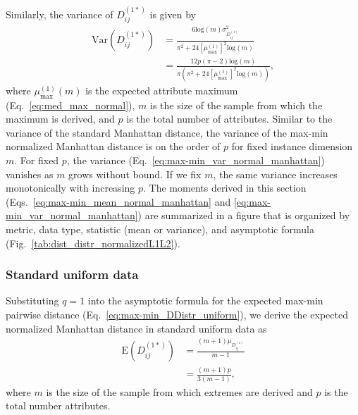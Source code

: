 \documentclass[10pt,letterpaper]{article}
\begin{document}
Similarly, the variance of $D^{(1*)}_{ij}$ is given by
%
\begin{equation}\label{eq:max-min_var_normal_manhattan}
\begin{aligned}
\text{Var}\left(D^{(1*)}_{ij}\right) &= \frac{6\text{log}(m)\sigma^2_{D^{(1)}_{ij}}}{\pi^2 + 24\left[\mu^{(1)}_\text{max}\right]^2\text{log}(m)} \\
&= \frac{12p(\pi-2)\text{log}(m)}{\pi\left(\pi^2 + 24\left[\mu^{(1)}_\text{max}\right]^2\text{log}(m)\right)},
\end{aligned}
\end{equation}
%
where $\mu^{(1)}_\text{max}(m)$ is the expected attribute maximum (Eq.~\ref{eq:med_max_normal}), $m$ is the size of the sample from which the maximum is derived, and $p$ is the total number of attributes. Similar to the variance of the standard Manhattan distance, the variance of the max-min normalized Manhattan distance is on the order of $p$ for fixed instance dimension $m$. For fixed $p$, the variance (Eq.~\ref{eq:max-min_var_normal_manhattan}) vanishes as $m$ grows without bound. If we fix $m$, the same variance increases monotonically with increasing $p$. The moments derived in this section (Eqs.~\ref{eq:max-min_mean_normal_manhattan} and \ref{eq:max-min_var_normal_manhattan}) are summarized in a figure that is organized by metric, data type, statistic (mean or variance), and asymptotic formula (Fig.~\ref{tab:dist_distr_normalizedL1L2}).

\subsubsection{Standard uniform data}

Substituting $q=1$ into the asymptotic formula for the expected max-min pairwise distance (Eq.~\ref{eq:max-min_DDistr_uniform}), we derive the expected normalized Manhattan distance in standard uniform data as
%
\begin{equation}\label{eq:max-min_mean_uniform_manhattan}
\begin{aligned}
\text{E}\left(D^{(1*)}_{ij}\right) &= \frac{(m+1)\mu_{D^{(1)}_{ij}}}{m-1} \\
&= \frac{(m+1)p}{3(m-1)},
\end{aligned}
\end{equation}
%
where $m$ is the size of the sample from which extremes are derived and $p$ is the total number attributes.
\end{document}
